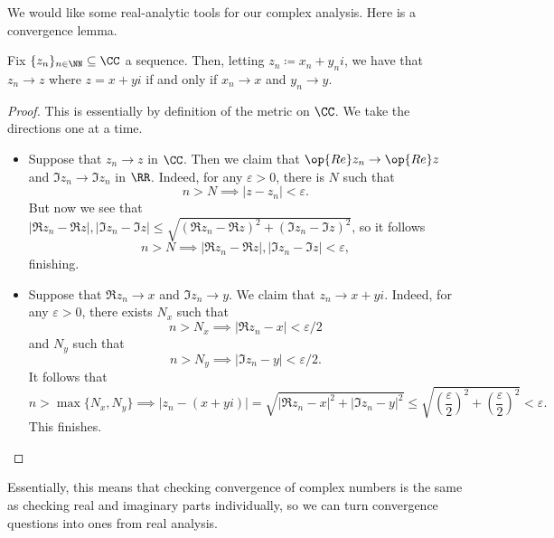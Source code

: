 We would like some real-analytic tools for our complex analysis. Here is a convergence lemma.
\begin{lemma} \label{lem:reducetor}
	Fix $\{z_n\}_{n\in\NN}\subseteq\CC$ a sequence. Then, letting $z_n\coloneqq x_n+y_ni$, we have that $z_n\to z$ where $z=x+yi$ if and only if $x_n\to x$ and $y_n\to y$.
\end{lemma}
\begin{proof}
	This is essentially by definition of the metric on $\CC$. We take the directions one at a time.
	\begin{itemize}
		\item Suppose that $z_n\to z$ in $\CC$. Then we claim that $\op{Re}z_n\to\op{Re}z$ and $\Im z_n\to\Im z_n$ in $\RR$. Indeed, for any $\varepsilon>0$, there is $N$ such that
		\[n>N\implies|z-z_n|<\varepsilon.\]
		But now we see that $|\Re z_n-\Re z|,|\Im z_n-\Im z|\le\sqrt{(\Re z_n-\Re z)^2+(\Im z_n-\Im z)^2}$, so it follows
		\[n>N\implies|\Re z_n-\Re z|,|\Im z_n-\Im z|<\varepsilon,\]
		finishing.
		\item Suppose that $\Re z_n\to x$ and $\Im z_n\to y$. We claim that $z_n\to x+yi$. Indeed, for any $\varepsilon>0$, there exists $N_x$ such that
		\[n>N_x\implies|\Re z_n-x|<\varepsilon/2\]
		and $N_y$ such that
		\[n>N_y\implies|\Im z_n-y|<\varepsilon/2.\]
		It follows that
		\[n>\max\{N_x,N_y\}\implies|z_n-(x+yi)|=\sqrt{|\Re z_n-x|^2+|\Im z_n-y|^2}\le\sqrt{\left(\frac\varepsilon2\right)^2+\left(\frac\varepsilon2\right)^2}<\varepsilon.\]
		This finishes.
		\qedhere
	\end{itemize}
\end{proof}
Essentially, this means that checking convergence of complex numbers is the same as checking real and imaginary parts individually, so we can turn convergence questions into ones from real analysis.

